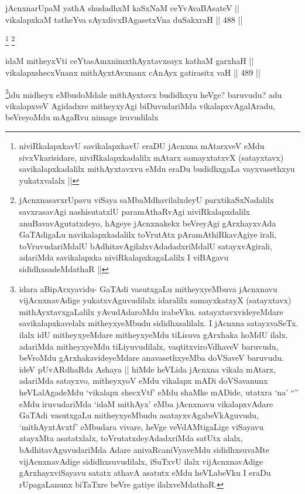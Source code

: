 \begin{shl}
jAcnxnarUpaM yathA shudadhxM kaSxNaM ceYvAvaBAsateV || \\
vikalapxkaM tatheYva sAyxdivxBAgasetxVna duSakxraH ||  488 ||  
\end{shl}

\begin{artha}
\footnote{niviRkalapxkavU savikalapxkavU eraDU jAcnxna mAtarxveV eMdu sivxVkarisidare, niviRkalapxkadalilx mAtarx samayxtatxvX (satayxtavx) savikalapxkadalilx mithAyxtavxvu eMdu eraDu budidhxgaLa vayxvasethxyu yukatxvalalx ||} \footnote{jAcnxnasavxrUpavu viSaya saMbaMdhavilalxdeyU parxtikaSxNadalilx savxrasavAgi nashisutatxlU paramAthaRvAgi niviRkalapxdalilx anuBavavAgutatxdeyo, hAgeye jAcnxnakekx beVreyAgi gArxhayxvAda GaTAdigaLu navikalapxkadalilx toVrutAtx pAramAthiRkavAgiye irali, toVruvudariMdalU bAdhitavAgilalxvAdadadxriMdalU satayxvAgirali, adariMda savikalapxka niviRkalapxkagaLalilx I viBAgavu sididhxsadeMdathaR ||}
\end{artha}

\begin{shl}
idaM mitheyxVti ceYtasAmxnimxthAyxtavxsayx kathaM garxhaH || \\
vikalapxshecxVnanx mithAyxtAvxnanx cAnAyx gatirasitx vaH ||  489 ||  
\end{shl}

\begin{artha}
\footnote{idara aBipArxyavidu- GaTAdi vasutxgaLu mitheyxyeMbuva jAcnxnavu vijAcnxnavAdige yukatxvAguvudilalx idaralilx samayxkatxyX (satayxtavx) mithAyxtavxgaLalilx yAvudAdaroMdu irabeVku. satayxtavxvideyeMdare savikalapxkavelalx mitheyxyeMbudu sididhxsalilalx. I jAcnxna satayxvaSeTx. ilalx idU mitheyxyeMdare mitheyxyeMdu tiLisuva gArxhaka hoMdU ilalx. adariMda mitheyxyeMdu tiLiyuvudilalx, vaqtitxviroVdhaveV baruvudu, beVroMdu gArxhakavideyeMdare anavasethxyeMba doVSaveV baruvudu. ideV pUvARdhaRda Ashaya || hiMde heVLida jAcnxna vikala mAtarx, adariMda satayxvo, mitheyxyoV eMdu vikalapx mADi doVSavanunx heVLalAgadeMdu `vikalapx shecxVtf' eMdu shaMke mADide, utatxra `na' ``\stext'' eMdu iruvudariMda `idaM mithAyx' eMba jAcnxnavu vikalapxvAdare GaTAdi vasutxgaLu mitheyxyeMbudu asatayxvAgabeVkAguvudu, `mithAyxtAvxtf' eMbudara vivare, heVge veVdAMtigaLige viSayavu atayxMta asatatxlalx, toVrutatxdeyAdadxriMda satUtx alalx, bAdhitavAguvudariMda Adare anivaRcaniVyaveMdu sididhxsuvaMte vijAcnxnavAdige sididhxsuvudilalx, iSuTxvU ilalx vijAcnxnavAdige gArxhayxviSayavu satatx athavA asatutx eMdu heVLabeVku I eraDu rUpagaLanunx biTaTxre beVre gatiye ilalxveMdathaR.}idu midheyx eMbudoMdale mithAyxtavx budidhxyu heVge? baruvudu? adu vikalapxveV Agidadxre mitheyxyAgi biDuvudariMda vikalapxvAgalAradu, beVreyoMdu mAgaRvu nimage iruvudilalx
\end{artha}


